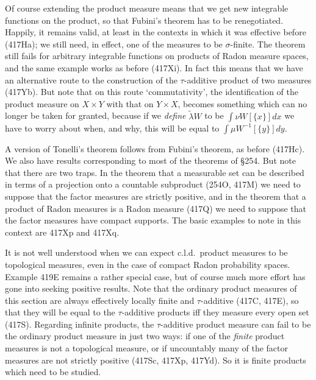 {Of course extending the product measure means that we get new integrable
functions on the product, so that Fubini's theorem has to be
renegotiated.   Happily, it remains valid, at least in the contexts in
which it was effective before (417Ha);   we still need, in effect, one
of the measures to be $\sigma$-finite.   The theorem still fails for
arbitrary integrable functions on products of
Radon measure spaces, and the same example works as before (417Xi).
In fact this means that we have an
alternative route to the construction of the $\tau$-additive product of
two measures (417Yb).   But note that on this route `commutativity', the
identification of the product measure on $X\times Y$ with that on
$Y\times X$, becomes something which can no longer be taken for granted,
because if we {\it define} $\tilde\lambda W$ to be $\int\nu W[\{x\}]dx$
we have to worry about when, and why, this will be equal to
$\int\mu W^{-1}[\{y\}]dy$.

A version of Tonelli's theorem follows from Fubini's theorem, as before
(417Hc).   We also have results corresponding to most of the theorems
of \S254.   But note that there are two traps.   In the theorem that a
measurable set can be described in terms of a projection onto a
countable subproduct (254O, 417M) we need to suppose that the factor
measures are strictly positive, and in the theorem that a product of
Radon measures is a Radon measure (417Q) we need to suppose that the
factor measures have compact supports.   The basic examples to note in
this context are 417Xp and 417Xq.

It is not well understood when we can expect c.l.d.\ product measures to
be topological measures, even in the case of compact Radon probability
spaces.   Example 419E remains a rather special case, but of course much
more effort has gone into seeking positive results.   Note that the
ordinary product measures of this section are always
effectively locally finite and $\tau$-additive (417C, 417E), so that
they will be equal to the $\tau$-additive products iff they measure
every open set (417S).   Regarding infinite products, the
$\tau$-additive product
measure can fail to be the ordinary product measure in just two ways:
if one of the {\it finite} product measures is not a topological
measure, or if uncountably many of the factor measures are not strictly
positive (417Sc, 417Xp, 417Yd).   So it is finite products which need
to be studied.

}
